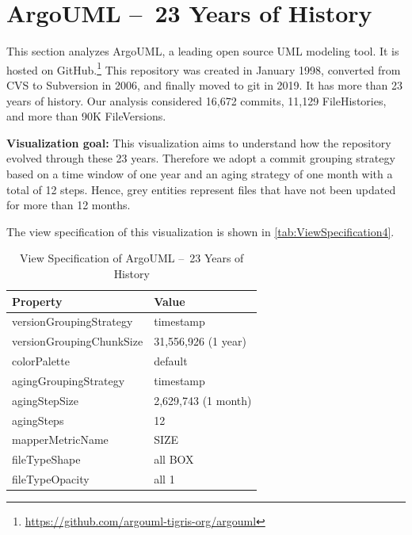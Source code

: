 \section{ArgoUML – 23 Years of History}
This section analyzes ArgoUML, a leading open source UML modeling tool. 
It is hosted on GitHub.\footnote{\url{https://github.com/argouml-tigris-org/argouml}}
This repository was created in January 1998, converted from CVS to Subversion in 2006, and finally moved to git in 2019.
It has more than 23 years of history. 
Our analysis considered 16,672 commits, 11,129 FileHistories, and more than 90K FileVersions. 

\bigbreak
\label{subsec:view4}
\noindent
\textbf{Visualization goal:}
This visualization aims to understand how the repository evolved through these 23 years. Therefore we adopt a commit grouping strategy based on a time window of one year and an aging strategy of one month with a total of 12 steps. Hence, grey entities represent files that have not been updated for more than 12 months. 


The view specification of this visualization is shown in \autoref{tab:ViewSpecification4}.
\begin{table}[h]
	\small
    \centering
    \begin{tabular}{@{}ll@{}} 
        \toprule
        \textbf{Property} & \textbf{Value} \\\midrule
        versionGroupingStrategy & timestamp\\ 
		versionGroupingChunkSize & 31,556,926 (1 year)\\
		colorPalette & default\\
		agingGroupingStrategy & timestamp \\
		agingStepSize & 2,629,743 (1 month) \\
		agingSteps & 12 \\
		mapperMetricName & SIZE \\
		fileTypeShape & all BOX \\
		fileTypeOpacity & all 1 \\\bottomrule
    \end{tabular}
    \caption{View Specification of ArgoUML – 23 Years of History}
    \label{tab:ViewSpecification4}
\end{table}

